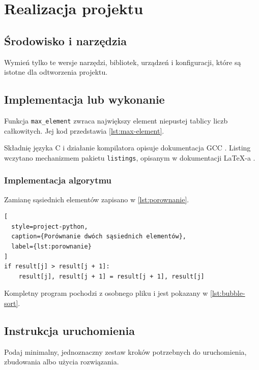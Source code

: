 \chapter{Realizacja projektu}
\label{chap:realizacja}

\section{Środowisko i narzędzia}
Wymień tylko te wersje narzędzi, bibliotek, urządzeń i konfiguracji, które są istotne dla odtworzenia projektu.

\section{Implementacja lub wykonanie}
Funkcja \texttt{max\_element} zwraca największy element niepustej tablicy liczb całkowitych. Jej kod przedstawia \cref{lst:max-element}.



Składnię języka C i działanie kompilatora opisuje dokumentacja GCC \cite{gcc2026}.
Listing wczytano mechanizmem pakietu \texttt{listings}, opisanym w dokumentacji LaTeX-a \cite{latexdocs2026}.
\subsection{Implementacja algorytmu}

Zamianę sąsiednich elementów zapisano w \cref{lst:porownanie}.

\begin{lstlisting}[
  style=project-python,
  caption={Porównanie dwóch sąsiednich elementów},
  label={lst:porownanie}
]
if result[j] > result[j + 1]:
    result[j], result[j + 1] = result[j + 1], result[j]
\end{lstlisting}

Kompletny program pochodzi z osobnego pliku i jest pokazany
w \cref{lst:bubble-sort}.



\section{Instrukcja uruchomienia}
Podaj minimalny, jednoznaczny zestaw kroków potrzebnych do uruchomienia, zbudowania albo użycia rozwiązania.

% 
